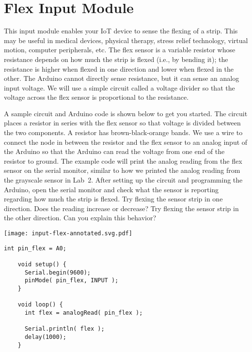 
\clearpage
\section{Flex Input Module}
\label{sec-input-flex}

This input module enables your IoT device to sense the flexing of a
 strip. This may be useful in medical devices, physical
therapy, stress relief technology, virtual motion, computer peripherals,
etc. The flex sensor is a variable resistor whose resistance depends on
how much the strip is flexed (i.e., by bending it); the resistance is
higher when flexed in one direction and lower when flexed in the other.
The Arduino cannot directly sense resistance, but it can sense an analog
input voltage. We will use a simple circuit called a voltage divider so
that the voltage across the flex sensor is proportional to the
resistance.

A sample circuit and Arduino code is shown below to get you started.
The circuit places a  resistor in series with the flex
sensor so that voltage is divided between the two components. A
 resistor has brown-black-orange bands. We use a wire
to connect the node in between the resistor and the flex sensor to an
analog input of the Arduino so that the Arduino can read the voltage
from one end of the  resistor to ground. The example
code will print the analog reading from the flex sensor on the serial
monitor, similar to how we printed the analog reading from the grayscale
sensor in Lab~2. After setting up the circuit and programming the
Arduino, open the serial monitor and check what the sensor is reporting
regarding how much the strip is flexed. Try flexing the sensor strip in
one direction. Does the reading increase or decrease? Try flexing the
sensor strip in the other direction. Can you explain this behavior?

\vspace{0.1in}
\begin{minipage}[t]{0.49\tw}
  \vspace{0pt}

  \texttt{[image: input-flex-annotated.svg.pdf]}
\end{minipage}
\hfill
\begin{minipage}[t]{0.49\tw}
  \vspace{0.1in}
  \begin{Verbatim}[gobble=3,fontsize=\small]
    int pin_flex = A0;

    void setup() {
      Serial.begin(9600);
      pinMode( pin_flex, INPUT );
    }

    void loop() {
      int flex = analogRead( pin_flex );

      Serial.println( flex );
      delay(1000);
    }
  \end{Verbatim}
\end{minipage}
\vspace{0.1in}

